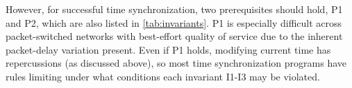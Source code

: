 However, for successful time synchronization, two prerequisites should hold,
P1 and P2, which are also listed in \cref{tab:invariants}.
P1 is especially difficult across packet-switched networks with best-effort
quality of service due to the inherent packet-delay variation present.
Even if P1 holds, modifying current time has repercussions (as discussed above),
so most time synchronization programs have rules limiting under what conditions
each invariant I1-I3 may be violated.



